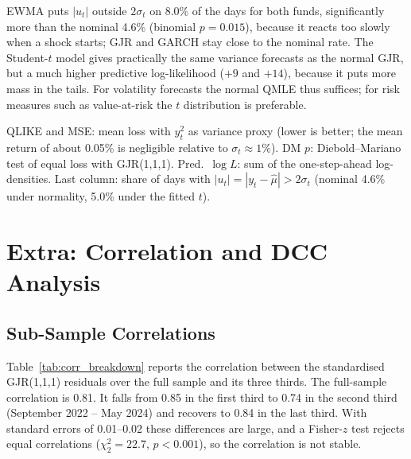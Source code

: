 \documentclass[10pt,a4paper]{article}
\begin{document}
EWMA puts $|u_t|$ outside $2\sigma_t$ on 8.0\% of the days for both funds, significantly more than the
nominal 4.6\% (binomial $p=0.015$), because it reacts too slowly when a shock starts; GJR and GARCH stay
close to the nominal rate. The Student-$t$ model gives practically the same variance forecasts as the
normal GJR, but a much higher predictive log-likelihood ($+9$ and $+14$), because it puts more mass in the
tails. For volatility forecasts the normal QMLE thus suffices; for risk measures such as value-at-risk the
$t$ distribution is preferable.

\begin{table}[htbp]
\centering
\caption{One-day-ahead forecasts for 2025 (251 days) from models estimated on 2021--2024}\label{tab:forecast}
\footnotesize
\setlength{\tabcolsep}{4.5pt}

\par\smallskip
\begin{minipage}{0.95\textwidth}\footnotesize
QLIKE and MSE: mean loss with $y_t^2$ as variance proxy (lower is better; the mean return of about
0.05\% is negligible relative to $\sigma_t\approx1\%$). DM $p$: Diebold--Mariano test of
equal loss with GJR(1,1,1). Pred.\ $\log L$: sum of the one-step-ahead log-densities. Last column: share of
days with $|u_t|=|y_t-\hat\mu|>2\sigma_t$ (nominal 4.6\% under normality, 5.0\% under the fitted $t$).
\end{minipage}
\end{table}

\section{Extra: Correlation and DCC Analysis}\label{sec:corr}

\subsection{Sub-Sample Correlations}
Table~\ref{tab:corr_breakdown} reports the correlation between the standardised GJR(1,1,1) residuals over
the full sample and its three thirds. The full-sample correlation is 0.81. It falls from 0.85 in the first
third to 0.74 in the second third (September 2022 -- May 2024) and recovers to 0.84 in the last third.
With standard errors of 0.01--0.02 these differences are large, and a Fisher-$z$ test rejects equal
correlations ($\chi^2_2=22.7$, $p<0.001$), so the correlation is not stable.
\end{document}
